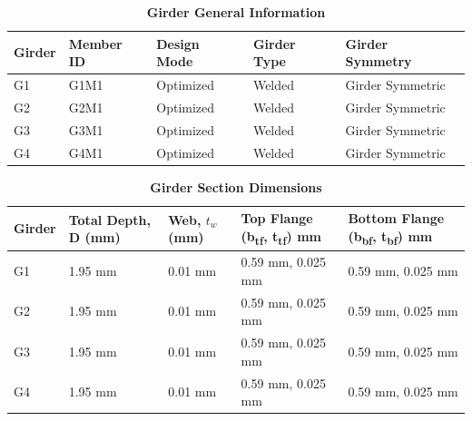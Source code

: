\documentclass[12pt,a4paper]{report}
\numberwithin{table}{chapter}
\numberwithin{figure}{chapter}
\begin{document}
\newpage

\vspace{0.4em}
\noindent
            
\vspace{4pt}
\begin{longtable}{|L{2.2cm}|L{1.8cm}|p{3.8cm}|p{3.8cm}|p{3.8cm}|}
\caption{\textbf{Girder General Information}}
\hline
\textbf{Girder} & \textbf{Member ID} & \textbf{Design Mode} & \textbf{Girder Type} & \textbf{Girder Symmetry} \\[6pt]
\hline
G1 & G1M1 & Optimized & Welded & Girder Symmetric \\[8pt]
\hline
G2 & G2M1 & Optimized & Welded & Girder Symmetric \\[8pt]
\hline
G3 & G3M1 & Optimized & Welded & Girder Symmetric \\[8pt]
\hline
G4 & G4M1 & Optimized & Welded & Girder Symmetric \\[8pt]
\hline
\end{longtable}

\vspace{0.6em}

\vspace{4pt}
\begin{longtable}{|L{1.8cm}|L{2.3cm}|L{1.8cm}|p{4.8cm}|p{4.8cm}|}
\caption{\textbf{Girder Section Dimensions}}
\hline
\textbf{Girder} & \textbf{Total Depth, D (mm)} & \textbf{Web, $t_w$ (mm)} & \textbf{Top Flange (b\textsubscript{tf}, t\textsubscript{tf}) mm} & \textbf{Bottom Flange (b\textsubscript{bf}, t\textsubscript{bf}) mm} \\[6pt]
\hline
G1 & 1.95 mm & 0.01 mm & 0.59 mm, 0.025 mm & 0.59 mm, 0.025 mm \\[8pt]
\hline
G2 & 1.95 mm & 0.01 mm & 0.59 mm, 0.025 mm & 0.59 mm, 0.025 mm \\[8pt]
\hline
G3 & 1.95 mm & 0.01 mm & 0.59 mm, 0.025 mm & 0.59 mm, 0.025 mm \\[8pt]
\hline
G4 & 1.95 mm & 0.01 mm & 0.59 mm, 0.025 mm & 0.59 mm, 0.025 mm \\[8pt]
\hline
\end{longtable}

\vspace{0.6em}
\end{document}
